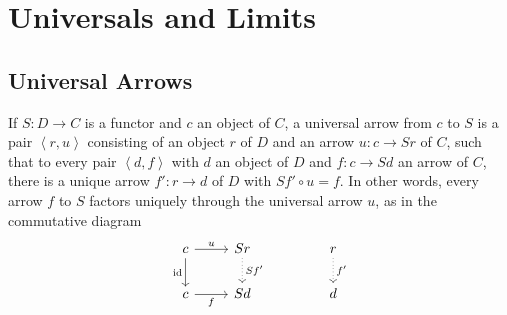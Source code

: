 \section{Universals and Limits} %
\label{sec:universals_and_limits}
\subsection{Universal Arrows} %
\label{sub:universal_arrows}
\begin{definition}
   If $ S: D \to C $ is a functor and $ c $ an object of $ C $, a universal arrow from $ c $ to $ S $ is a pair $ \left\langle r, u \right\rangle $ consisting of an object $ r $ of $ D $ and an arrow $ u: c \to Sr $ of $ C $, such that to every pair $ \left\langle d,f \right\rangle  $ with $ d $ an object of $ D $ and $ f: c \to Sd $ an arrow of $ C $, there is a unique arrow $ f': r\to d $ of $ D $ with $ Sf'\circ u = f $. In other words, every arrow $ f $ to $ S $ factors uniquely through the universal arrow $ u $, as in the commutative diagram
   \[\begin{tikzcd}
	   c & Sr && r \\
	   c & Sd && d
	   \arrow["u", from=1-1, to=1-2]
	   \arrow["{Sf'}", dotted, from=1-2, to=2-2]
	   \arrow["f"', from=2-1, to=2-2]
	   \arrow["{\text{id}}"', from=1-1, to=2-1]
	   \arrow["{f'}", dotted, from=1-4, to=2-4]
   \end{tikzcd}\]
\end{definition}
